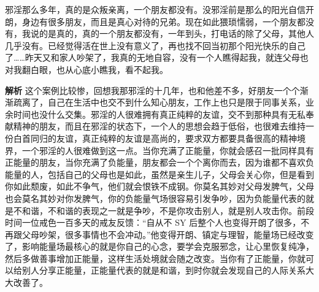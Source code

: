 \begin{case}
    邪淫那么多年，真的是众叛亲离，一个朋友都没有。没邪淫前是那么的阳光自信开朗，身边有很多朋友，而且是真心对待的兄弟。现在如此猥琐懦弱，一个朋友都没有，我说的是真的，真的一个朋友都没有，一年到头，打电话的除了父母，其他人几乎没有。已经觉得活在世上没有意义了，再也找不回当初那个阳光快乐的自己了……昨天又和家人吵架了，我真的无地自容，没有一个人瞧得起我，就连父母也对我翻白眼，也从心底小瞧我，看不起我。

    \textbf{解析} 这个案例比较惨，回想我那邪淫的十几年，也和他差不多，好朋友一个个渐渐疏离了，自己在生活中也交不到什么知心朋友，工作上也只是限于同事关系，业余时间也没什么交集。邪淫的人很难拥有真正纯粹的友谊，交不到那种具有无私奉献精神的朋友，而且在邪淫的状态下，一个人的思想会趋于低俗，也很难去维持一份白首同归的友谊，真正纯粹的友谊是高尚的，要求双方都要具备很高的精神境界，一个邪淫的人很难做到这一点。当你充满了正能量，你就会感召一批同样具有正能量的朋友，当你充满了负能量，朋友都会一个个离你而去，因为谁都不喜欢负能量的人，包括自己的父母也是如此，虽然是亲生儿子，父母会关心你，但是看到你如此颓废，如此不争气，他们就会恨铁不成钢。你莫名其妙对父母发脾气，父母也会莫名其妙对你发脾气，你的负能量气场很容易引发争吵，因为负能量代表的就是不和谐，不和谐的表现之一就是争吵，不是你攻击别人，就是别人攻击你。前段时间一位戒色一百多天的戒友反馈：“自从不 SY 后整个人也变得开朗了很多，不再跟父母吵架，很多事情也不会冲动。”他变得开朗、镇定与理智，能量场已经改变了，影响能量场最核心的就是你自己的心念，要学会克服邪念，让心里恢复纯净，然后多做善事增加正能量，这样生活处境就会随之改变。当你有了正能量，你就可以给别人分享正能量，正能量代表的就是和谐，到时你就会发现自己的人际关系大大改善了。
\end{case}


